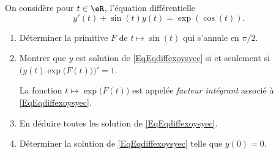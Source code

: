 
\begin{exercice}\label{exoTD6-0001}

	On considère pour $t\in\eR$, l'équation différentielle
	\begin{equation}		\label{EqEqdiffexoysyec}
		y'(t)+\sin(t)y(t)=\exp(\cos(t)).
	\end{equation}
	\begin{enumerate}
		\item
			Déterminer la primitive $F$ de $t\mapsto\sin(t)$ qui s'annule en $\pi/2$.
		\item
			Montrer que $y$ est solution de \eqref{EqEqdiffexoysyec} si et seulement si $\Big( y(t)\exp\big( F(t) \big) \Big)'=1$.

			La fonction $t\mapsto\exp\big( F(t) \big)$ est appelée \emph{facteur intégrant} associé à \eqref{EqEqdiffexoysyec}.
		\item
			En déduire toutes les solution de \eqref{EqEqdiffexoysyec}.
		\item
			Déterminer la solution de \eqref{EqEqdiffexoysyec} telle que $y(0)=0$.

	\end{enumerate}

\end{exercice}
